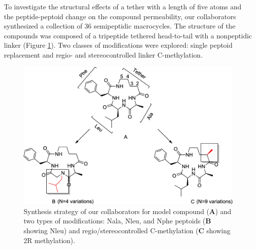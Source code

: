 To investigate the structural effects of a tether with a length of five atoms and the peptide-peptoid change on the compound permeability, our collaborators synthesized a collection of 36 semipeptidic macrocycles. \cite{Comeau2021, Roux2020}
The structure of the compounds was composed of a tripeptide tethered head-to-tail with a nonpeptidic linker (Figure \ref{fig:MolDes}). 
Two classes of modifications were explored: single peptoid replacement and regio- and stereocontrolled linker C-methylation. 
%
\begin{figure}[h!]
    \centering
    \includegraphics[width=\textwidth]{7_chapter_5/fig/intro/MoleculeDesign.jpeg}
    \caption{Synthesis strategy of our collaborators for model compound (\textbf{A}) and two types of modifications: Nala, Nleu, and Nphe peptoids (\textbf{B} showing Nleu) and regio/stereocontrolled C-methylation (\textbf{C} showing 2R methylation).\cite{Comeau2021}}
    \label{fig:MolDes}
\end{figure}

